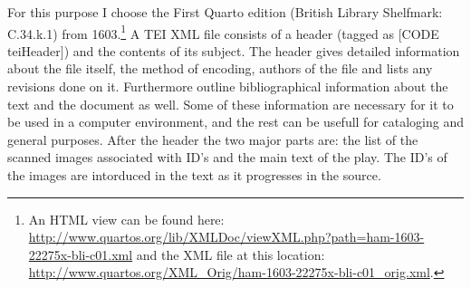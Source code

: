\documentclass{article}
\begin{document}
For this purpose I choose the First Quarto edition (British Library Shelfmark: C.34.k.1) from 1603.\footnote{An HTML view can be found here: \url{http://www.quartos.org/lib/XMLDoc/viewXML.php?path=ham-1603-22275x-bli-c01.xml} and the XML file at this location: \url{http://www.quartos.org/XML_Orig/ham-1603-22275x-bli-c01_orig.xml}.} A TEI XML file consists of a header (tagged as [CODE teiHeader]) and the contents of its subject. The header gives detailed information about the file itself, the method of encoding, authors of the file and lists any revisions done on it. Furthermore outline bibliographical information about the text and the document as well. Some of these information are necessary for it to be used in a computer environment, and the rest can be usefull for cataloging and general purposes. After the header the two major parts are: the list of the scanned images associated with ID's and the main text of the play. The ID's of the images are intorduced in the text as it progresses in the source.
\end{document}
